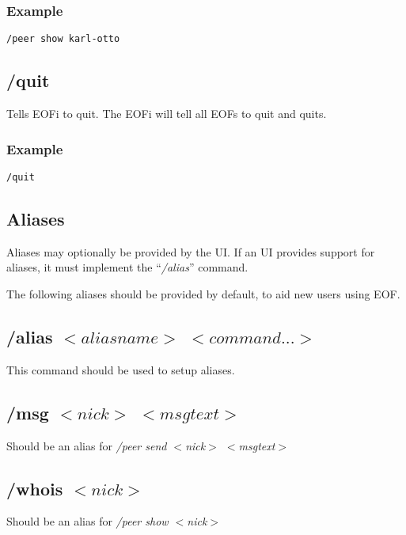 \documentclass[12pt,a4paper]{book}
\begin{document}
\subsubsection{Example}
\begin{verbatim}
/peer show karl-otto
\end{verbatim}
\subsection{/quit}
Tells EOFi to quit. The EOFi will tell all EOFs to quit and quits.
\subsubsection{Example}
\begin{verbatim}
/quit
\end{verbatim}
\subsection{Aliases}
Aliases may optionally be provided by the UI. If an UI provides
support for aliases, it must implement the "`\emph{/alias}"' command.

The following aliases should be provided by default,
to aid new users using EOF.
\subsection{/alias $<aliasname>$ $<command...>$}
This command should be used to setup aliases.
\subsection{/msg $<nick>$ $<msgtext>$}
Should be an alias for \textit{/peer send $<$nick$>$ $<$msgtext$>$}
\subsection{/whois $<nick>$}
Should be an alias for \textit{/peer show $<$nick$>$}

\end{document}
